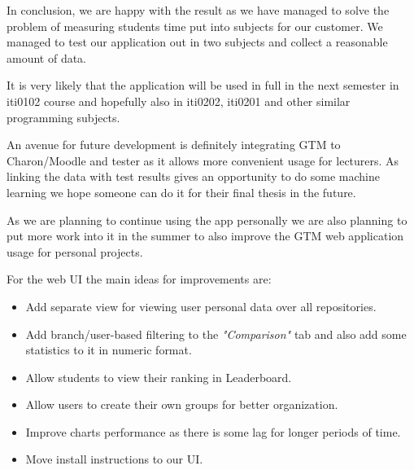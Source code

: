 In conclusion, we are happy with the result as we have managed to solve the problem of measuring students time
put into subjects for our customer.
We managed to test our application out in two subjects and collect a reasonable amount of data.

It is very likely that the application will be used in full in the next semester in iti0102 course and hopefully also in
iti0202, iti0201 and other similar programming subjects.

An avenue for future development is definitely integrating GTM to Charon/Moodle and tester as it allows more convenient usage for lecturers.
As linking the data with test results gives an opportunity to do some machine learning we hope someone can do it for their final thesis in the future.

As we are planning to continue using the app personally we are also planning to put more work into it in the summer to
also improve the GTM web application usage for personal projects.

For the web UI the main ideas for improvements are:
\begin{itemize}
    \item Add separate view for viewing user personal data over all repositories.
    \item Add branch/user-based filtering to the \textit{"Comparison"} tab and also add some statistics to it in numeric format.
    \item Allow students to view their ranking in Leaderboard.
    \item Allow users to create their own groups for better organization.
    \item Improve charts performance as there is some lag for longer periods of time.
    \item Move install instructions to our UI.
\end{itemize}


